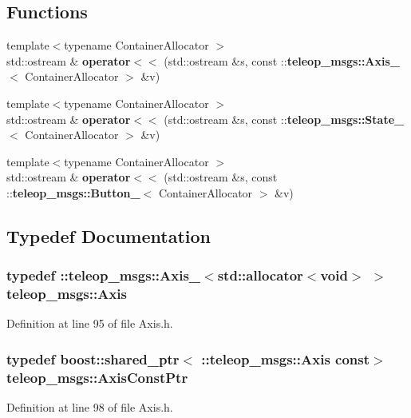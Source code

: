 \subsection*{Functions}
\begin{DoxyCompactItemize}
\item 
{\footnotesize template$<$typename ContainerAllocator $>$ }\\std::ostream \& {\bf operator$<$$<$} (std::ostream \&s, const ::{\bf teleop\_\-msgs::Axis\_\-}$<$ ContainerAllocator $>$ \&v)
\item 
{\footnotesize template$<$typename ContainerAllocator $>$ }\\std::ostream \& {\bf operator$<$$<$} (std::ostream \&s, const ::{\bf teleop\_\-msgs::State\_\-}$<$ ContainerAllocator $>$ \&v)
\item 
{\footnotesize template$<$typename ContainerAllocator $>$ }\\std::ostream \& {\bf operator$<$$<$} (std::ostream \&s, const ::{\bf teleop\_\-msgs::Button\_\-}$<$ ContainerAllocator $>$ \&v)
\end{DoxyCompactItemize}


\subsection{Typedef Documentation}
\subsubsection[{Axis}]{\setlength{\rightskip}{0pt plus 5cm}typedef ::{\bf teleop\_\-msgs::Axis\_\-}$<$std::allocator$<$void$>$ $>$ {\bf teleop\_\-msgs::Axis}}\label{namespaceteleop__msgs_a7e1caf8ba1fabeb8443d8bae28a5e2c0}


Definition at line 95 of file Axis.h.

\subsubsection[{AxisConstPtr}]{\setlength{\rightskip}{0pt plus 5cm}typedef boost::shared\_\-ptr$<$ ::{\bf teleop\_\-msgs::Axis} const$>$ {\bf teleop\_\-msgs::AxisConstPtr}}\label{namespaceteleop__msgs_a0338f261c6d2335461673a2d3ac2754f}


Definition at line 98 of file Axis.h.

